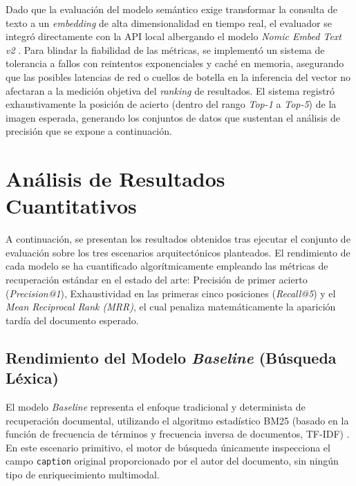 \documentclass[a4paper]{report}
\begin{document}
Dado que la evaluación del modelo semántico exige transformar la consulta de texto a un \textit{embedding} de alta dimensionalidad en tiempo real, el evaluador se integró directamente con la API local albergando el modelo \textit{Nomic Embed Text v2} \cite{nussbaum2024nomic}. Para blindar la fiabilidad de las métricas, se implementó un sistema de tolerancia a fallos con reintentos exponenciales y caché en memoria, asegurando que las posibles latencias de red o cuellos de botella en la inferencia del vector no afectaran a la medición objetiva del \textit{ranking} de resultados. El sistema registró exhaustivamente la posición de acierto (dentro del rango \textit{Top-1} a \textit{Top-5}) de la imagen esperada, generando los conjuntos de datos que sustentan el análisis de precisión que se expone a continuación.

\begingroup
\let\clearpage\relax %
\let\newpage\relax   %
\vspace{0.5cm}       %

\section{Análisis de Resultados Cuantitativos}
\label{sec:resultados_numericos}
\endgroup

A continuación, se presentan los resultados obtenidos tras ejecutar el conjunto de evaluación sobre los tres escenarios arquitectónicos planteados. El rendimiento de cada modelo se ha cuantificado algorítmicamente empleando las métricas de recuperación estándar en el estado del arte: Precisión de primer acierto (\textit{Precision@1}), Exhaustividad en las primeras cinco posiciones (\textit{Recall@5}) y el \textit{Mean Reciprocal Rank (MRR)}, el cual penaliza matemáticamente la aparición tardía del documento esperado.

\subsection{Rendimiento del Modelo \textit{Baseline} (Búsqueda Léxica)}
El modelo \textit{Baseline} representa el enfoque tradicional y determinista de recuperación documental, utilizando el algoritmo estadístico BM25 (basado en la función de frecuencia de términos y frecuencia inversa de documentos, TF-IDF) \cite{manning2008introduction}. En este escenario primitivo, el motor de búsqueda únicamente inspecciona el campo \texttt{caption} original proporcionado por el autor del documento, sin ningún tipo de enriquecimiento multimodal.
\end{document}
